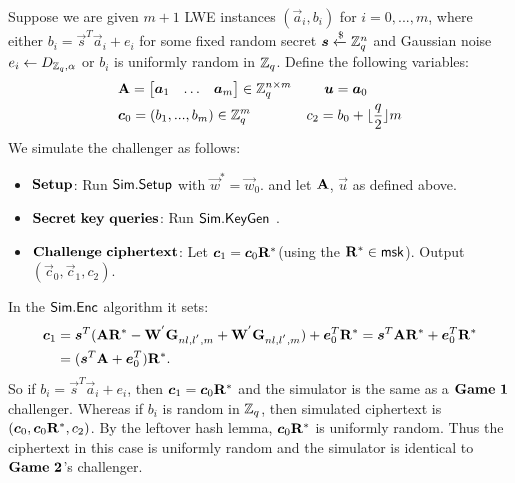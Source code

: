 Suppose we are given $m+1$ LWE instances $(\vec{a}_{i},b_{i})$ for $i=0,...,m$, where either $b_{i}=\vec{s}^{T}\vec{a}_{i}+e_{i}$ for some fixed random secret $\boldsymbol{s}\xleftarrow{\$} \mathbb{Z}^{n}_{q}$ and  Gaussian noise $e_{i}\leftarrow D_{\mathbb{Z}_{q},\alpha}$ or $b_{i}$ is uniformly random in $\mathbb{Z}_{q}$. Define the following variables:
\begin{equation}
\begin{split}
&\mathbf{A}=\begin{bmatrix}
\boldsymbol{a}_{1}&\ldots&\boldsymbol{a}_{m}
\end{bmatrix} \in \mathbb{Z}^{n \times m}_{q} ~~~~~~~ \boldsymbol{u}=\boldsymbol{a}_{0}\\
&\boldsymbol{c}_{0}=(b_{1},...,b_{m}) \in \mathbb{Z}^{m}_{q}~~~~~~~~~~~~c_{2}=b_{0}+\lfloor \frac{q}{2}\rfloor m\\
\end{split}
\end{equation}
We simulate the challenger as follows:
\begin{itemize}
\item $\mathbf{Setup}$: Run $\mathsf{Sim}.\mathsf{Setup}$ with $\vec{w}^{*}=\vec{w}_{0}$. and let $\mathbf{A}$, $\vec{u}$ as defined above.

\item $\mathbf{Secret}\  \mathbf{key}\  \mathbf{queries}$: Run $\mathsf{Sim}.\mathsf{KeyGen}$ .

\item $\mathbf{Challenge}\  \mathbf{ciphertext}$: Let $\boldsymbol{c}_{1}=\boldsymbol{c}_{0}\mathbf{R}^{*}$(using the $\mathbf{R}^{*} \in \mathsf{msk}$). Output $(\vec{c}_{0}, \vec{c}_{1}, c_{2})$.
\end{itemize}
In the $\mathsf{Sim}.\mathsf{Enc}$ algorithm it sets:
\begin{equation}
\begin{split}
\boldsymbol{c}_{1}&=\boldsymbol{s}^{T}(\mathbf{A}\mathbf{R}^{*}-\mathbf{W}^{'}\mathbf{G}_{nl,l^{'},m}+\mathbf{W}^{'}\mathbf{G}_{nl,l^{'},m})+\boldsymbol{e}^{T}_{0}\mathbf{R}^{*}=\boldsymbol{s}^{T}\mathbf{A}\mathbf{R}^{*}+\boldsymbol{e}^{T}_{0}\mathbf{R}^{*}\\
&=(\boldsymbol{s}^{T}\mathbf{A}+\boldsymbol{e}^{T}_{0})\mathbf{R}^{*}.
\end{split}
\end{equation}
So if $b_{i}=\vec{s}^{T}\vec{a}_{i}+e_{i}$, then $\boldsymbol{c}_{1}=\boldsymbol{c}_{0}\mathbf{R}^{*}$ and the simulator is the same as a $\mat{Game\ 1}$ challenger. Whereas if $b_{i}$ is random in $\mathbb{Z}_{q}$, then simulated ciphertext is $(\boldsymbol{c}_{0}, \boldsymbol{c}_{0}\mathbf{R}^{*}, c_{2})$. By the leftover hash lemma, $\boldsymbol{c}_{0}\mathbf{R}^{*}$ is uniformly random. Thus the ciphertext in this case is uniformly random and the simulator is identical to $\mat{Game\ 2}$'s challenger.\

